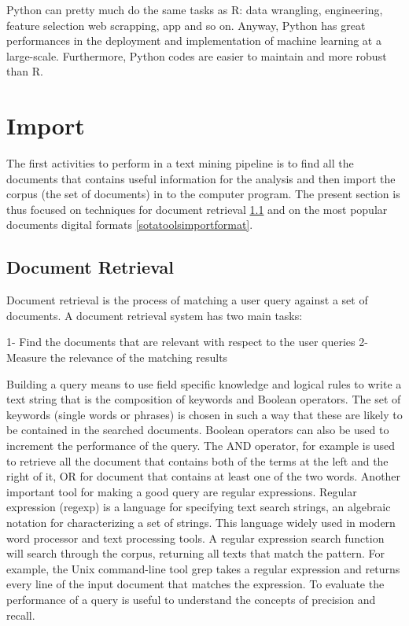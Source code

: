 \documentclass[]{book}
\theoremstyle{definition}
\theoremstyle{definition}
\theoremstyle{definition}
\theoremstyle{remark}
\begin{document}
Python can pretty much do the same tasks as R: data wrangling,
engineering, feature selection web scrapping, app and so on. Anyway,
Python has great performances in the deployment and implementation of
machine learning at a large-scale. Furthermore, Python codes are easier
to maintain and more robust than R.

\section{Import}\label{sotatoolsimport}

The first activities to perform in a text mining pipeline is to find all
the documents that contains useful information for the analysis and then
import the corpus (the set of documents) in to the computer program. The
present section is thus focused on techniques for document retrieval
\ref{sotatoolsimportretrieval} and on the most popular documents digital
formats \ref{sotatoolsimportformat}.

\subsection{Document Retrieval}\label{sotatoolsimportretrieval}

Document retrieval is the process of matching a user query against a set
of documents. A document retrieval system has two main tasks:

1- Find the documents that are relevant with respect to the user queries
2- Measure the relevance of the matching results

Building a query means to use field specific knowledge and logical rules
to write a text string that is the composition of keywords and Boolean
operators. The set of keywords (single words or phrases) is chosen in
such a way that these are likely to be contained in the searched
documents. Boolean operators can also be used to increment the
performance of the query. The AND operator, for example is used to
retrieve all the document that contains both of the terms at the left
and the right of it, OR for document that contains at least one of the
two words. Another important tool for making a good query are regular
expressions. Regular expression (regexp) is a language for specifying
text search strings, an algebraic notation for characterizing a set of
strings. This language widely used in modern word processor and text
processing tools. A regular expression search function will search
through the corpus, returning all texts that match the pattern. For
example, the Unix command-line tool grep takes a regular expression and
returns every line of the input document that matches the expression. To
evaluate the performance of a query is useful to understand the concepts
of precision and recall.
\end{document}
